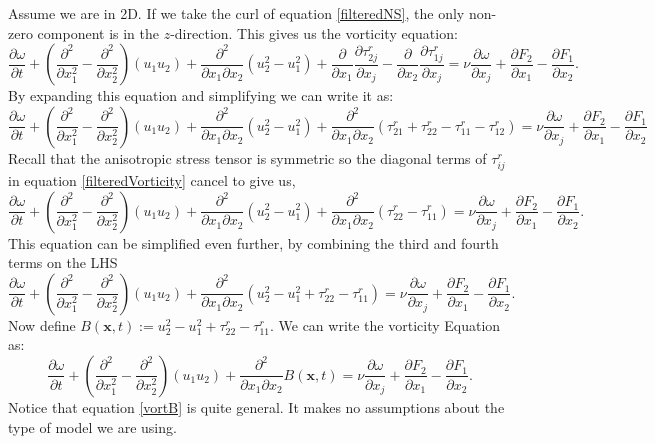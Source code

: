 \documentclass[11pt,a4paper]{article}
\begin{document}
Assume we are in 2D. If we take the curl of equation \ref{filteredNS}, the only non-zero component is in the $z$-direction. This gives us the vorticity equation:
$$\frac{\partial \omega}{\partial t}  + \left(\frac{\partial^2}{\partial x_1^2} - \frac{\partial^2}{\partial x_2^2}\right)(u_1u_2) +\frac{\partial^2}{\partial x_1\partial x_2}\left(u_2^2-u_1^2\right)+ \frac{\partial }{\partial x_1}\frac{\partial \tau_{2j}^r}{\partial x_j} - \frac{\partial }{\partial x_2}\frac{\partial \tau_{1j}^r}{\partial x_j}= \nu \frac{\partial \omega}{\partial x_j}+\frac{\partial F_2}{\partial x_1} - \frac{\partial F_1}{\partial x_2}.$$
By expanding this equation and simplifying we can write it as:
\begin{equation}\label{filteredVorticity}
\frac{\partial \omega}{\partial t}  + \left(\frac{\partial^2}{\partial x_1^2} - \frac{\partial^2}{\partial x_2^2}\right)(u_1u_2) +\frac{\partial^2}{\partial x_1\partial x_2}\left(u_2^2-u_1^2\right)+ \frac{\partial^2 }{\partial x_1\partial x_2}\left( \tau_{21}^r+\tau_{22}^r-  \tau_{11}^r-\tau_{12}^r\right)= \nu \frac{\partial \omega}{\partial x_j}+\frac{\partial F_2}{\partial x_1} - \frac{\partial F_1}{\partial x_2}
\end{equation}
Recall that the anisotropic stress tensor is symmetric so the diagonal terms of $\tau_{ij}^r$ in equation \ref{filteredVorticity} cancel to give us,
$$\frac{\partial \omega}{\partial t}  + \left(\frac{\partial^2}{\partial x_1^2} - \frac{\partial^2}{\partial x_2^2}\right)(u_1u_2) +\frac{\partial^2}{\partial x_1\partial x_2}\left(u_2^2-u_1^2\right)+ \frac{\partial^2 }{\partial x_1\partial x_2}\left( \tau_{22}^r-  \tau_{11}^r\right)= \nu \frac{\partial \omega}{\partial x_j}+\frac{\partial F_2}{\partial x_1} - \frac{\partial F_1}{\partial x_2}.$$
This equation can be simplified even further, by combining the third and fourth terms on the LHS
$$\frac{\partial \omega}{\partial t}  + \left(\frac{\partial^2}{\partial x_1^2} - \frac{\partial^2}{\partial x_2^2}\right)(u_1u_2) +\frac{\partial^2}{\partial x_1\partial x_2}\left(u_2^2-u_1^2 + \tau_{22}^r-  \tau_{11}^r\right)= \nu \frac{\partial \omega}{\partial x_j}+\frac{\partial F_2}{\partial x_1} - \frac{\partial F_1}{\partial x_2}.$$
Now define $B(\boldsymbol{x}, t) :=u_2^2-u_1^2+ \tau_{22}^r - \tau_{11}^r$. We can write the vorticity Equation as:
\begin{equation}\label{vortB}
\frac{\partial \omega}{\partial t}  + \left(\frac{\partial^2}{\partial x_1^2} - \frac{\partial^2}{\partial x_2^2}\right)(u_1u_2) + \frac{\partial^2 }{\partial x_1\partial x_2}B(\boldsymbol{x}, t)= \nu \frac{\partial \omega}{\partial x_j}+\frac{\partial F_2}{\partial x_1} - \frac{\partial F_1}{\partial x_2} .
\end{equation}
Notice that equation \ref{vortB} is quite general. It makes no assumptions about the type of model we are using. 
\end{document}
